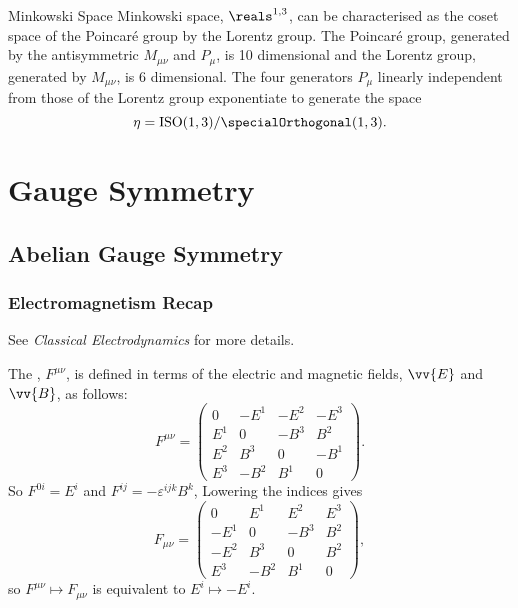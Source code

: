 \documentclass[fleqn]{NotesClass}
\newcommand{\course}[1]{\textit{#1}}
\newcommand{\minkowskiSpace}{\reals^{1,3}}
\newcommand{\minkowskiMetric}{\eta}
\DeclareMathOperator{\ISO}{ISO}
\begin{document}
    
    \begin{exm}{Minkowski Space}{}
        Minkowski space, \(\minkowskiSpace\), can be characterised as the coset space of the Poincar\'e group by the Lorentz group.
        The Poincar\'e group, generated by the antisymmetric \(M_{\mu\nu}\) and \(P_\mu\), is 10 dimensional and the Lorentz group, generated by \(M_{\mu\nu}\), is 6 dimensional.
        The four generators \(P_\mu\) linearly independent from those of the Lorentz group exponentiate to generate the space
        \begin{equation}
            \minkowskiMetric = \ISO(1, 3)/\specialOrthogonal(1, 3).
        \end{equation}
    \end{exm}
    
    
    \part{Gauge Symmetry}
    \chapter{Abelian Gauge Symmetry}
    \section{Electromagnetism Recap}
    \begin{rmk}
        See \course{Classical Electrodynamics} for more details.
    \end{rmk}
    The , \(F^{\mu\nu}\), is defined in terms of the electric and magnetic fields, \(\vv{E}\) and \(\vv{B}\), as follows:
    \begin{equation}
        F^{\mu\nu} =
        \begin{pmatrix}
            0 & -E^1 & -E^2 & -E^3\\
            E^1 & 0 & -B^3 & B^2\\
            E^2 & B^3 & 0 & -B^1\\
            E^3 & -B^2 & B^1 & 0
        \end{pmatrix}
        .
    \end{equation}
    So \(F^{0i} = E^i\) and \(F^{ij} = -\varepsilon^{ijk}B^k\),
    Lowering the indices gives
    \begin{equation}
        F_{\mu\nu} = 
        \begin{pmatrix}
            0 & E^1 & E^2 & E^3\\
            -E^1 & 0 & -B^3 & B^2\\
            -E^2 & B^3 & 0 & B^2\\
            E^3 & -B^2 & B^1 & 0
        \end{pmatrix}
        ,
    \end{equation}
    so \(F^{\mu\nu} \mapsto F_{\mu\nu}\) is equivalent to \(E^i \mapsto -E^i\).
    
\end{document}

